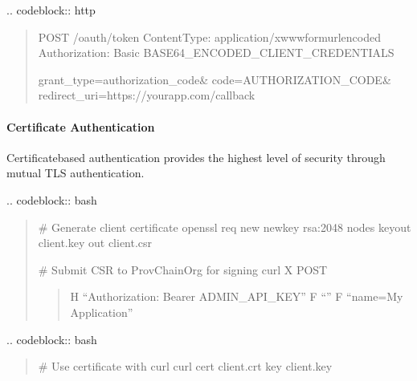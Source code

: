 \documentclass[letterpaper,10pt,english]{sphinxmanual}
\begin{document}
\sphinxAtStartPar
{}
.. code\sphinxhyphen{}block:: http
\begin{quote}

\sphinxAtStartPar
POST /oauth/token
Content\sphinxhyphen{}Type: application/x\sphinxhyphen{}www\sphinxhyphen{}form\sphinxhyphen{}urlencoded
Authorization: Basic BASE64\_ENCODED\_CLIENT\_CREDENTIALS

\sphinxAtStartPar
grant\_type=authorization\_code\&
code=AUTHORIZATION\_CODE\&
redirect\_uri=https://your\sphinxhyphen{}app.com/callback
\end{quote}


\paragraph{Certificate Authentication}
\label{\detokenize{api/authentication:certificate-authentication}}
\sphinxAtStartPar
Certificate\sphinxhyphen{}based authentication provides the highest level of security through mutual TLS authentication.

\sphinxAtStartPar
{}
.. code\sphinxhyphen{}block:: bash
\begin{quote}

\sphinxAtStartPar
\# Generate client certificate
openssl req \sphinxhyphen{}new \sphinxhyphen{}newkey rsa:2048 \sphinxhyphen{}nodes \sphinxhyphen{}keyout client.key \sphinxhyphen{}out client.csr

\sphinxAtStartPar
\# Submit CSR to ProvChainOrg for signing
curl \sphinxhyphen{}X POST  
\begin{quote}

\sphinxAtStartPar
\sphinxhyphen{}H “Authorization: Bearer ADMIN\_API\_KEY” \sphinxhyphen{}F “” \sphinxhyphen{}F “name=My Application”
\end{quote}
\end{quote}

\sphinxAtStartPar
{}
.. code\sphinxhyphen{}block:: bash
\begin{quote}

\sphinxAtStartPar
\# Use certificate with curl
curl \textendash{}cert client.crt \textendash{}key client.key 
\begin{quote}

\sphinxAtStartPar
{}
\end{quote}
\end{quote}
\end{document}
